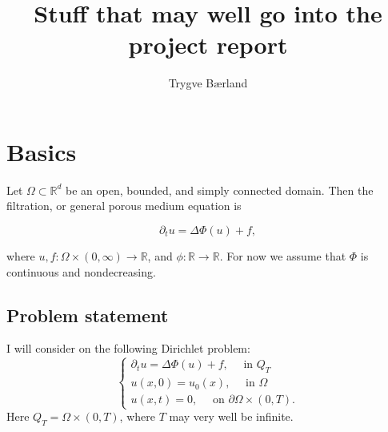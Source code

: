 \documentclass[11pt, a4paper]{article}
\begin{document}
\title{Stuff that may well go into the project report}
\author{Trygve Bærland}
\maketitle
{}

\theoremstyle{plain}
\newtheorem{theorem}{Theorem}[section]
\newtheorem{proposition}{Proposition}[section]

\theoremstyle{definition}
\newtheorem{mydef}{Definition}[section]
\newtheorem{example}{Example}[section]

\newtheorem{obs}{Observation}
\newtheorem{rem}{Remark}


\section{Basics}


Let $\Omega \subset \mathbb{R}^d$ be an open, bounded, and simply connected domain. Then the filtration, or general porous medium equation is

\begin{equation}
\label{GPME}
	\partial_t u = \Delta \Phi(u) + f,
\end{equation}

 where $u, f: \Omega \times (0,\infty) \to \mathbb{R}$, and $\phi: \mathbb{R} \to \mathbb{R}$. For now we assume that $\Phi$ is continuous and nondecreasing.


\subsection{Problem statement}
I will consider on the following Dirichlet problem:
\begin{equation}
\label{HDP}
	\begin{cases}
		\partial_t u = \Delta \Phi(u) + f, \quad \text{ in } Q_T \\
		u(x,0) = u_0(x), \quad \text{ in } \Omega \\
		u(x,t) = 0, \quad \text{ on } \partial\Omega \times (0,T).
	\end{cases}
\end{equation}
Here $Q_T = \Omega \times (0,T)$, where $T$ may very well be infinite.
\end{document}
